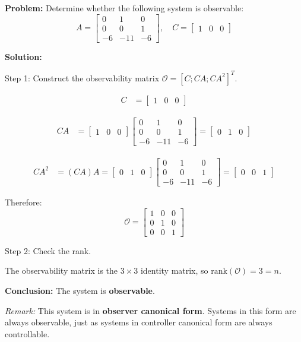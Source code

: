 \begin{examplebox}
\textbf{Problem:} Determine whether the following system is observable:
\begin{equation}
A = \begin{bmatrix} 0 & 1 & 0 \\ 0 & 0 & 1 \\ -6 & -11 & -6 \end{bmatrix}, \quad
C = \begin{bmatrix} 1 & 0 & 0 \end{bmatrix}
\end{equation}

\textbf{Solution:}

Step 1: Construct the observability matrix $\mathcal{O} = [C; CA; CA^2]^T$.

\begin{align}
C &= \begin{bmatrix} 1 & 0 & 0 \end{bmatrix}
\end{align}

\begin{align}
CA &= \begin{bmatrix} 1 & 0 & 0 \end{bmatrix} \begin{bmatrix} 0 & 1 & 0 \\ 0 & 0 & 1 \\ -6 & -11 & -6 \end{bmatrix} = \begin{bmatrix} 0 & 1 & 0 \end{bmatrix}
\end{align}

\begin{align}
CA^2 &= (CA)A = \begin{bmatrix} 0 & 1 & 0 \end{bmatrix} \begin{bmatrix} 0 & 1 & 0 \\ 0 & 0 & 1 \\ -6 & -11 & -6 \end{bmatrix} = \begin{bmatrix} 0 & 0 & 1 \end{bmatrix}
\end{align}

Therefore:
\begin{equation}
\mathcal{O} = \begin{bmatrix} 1 & 0 & 0 \\ 0 & 1 & 0 \\ 0 & 0 & 1 \end{bmatrix}
\end{equation}

Step 2: Check the rank.

The observability matrix is the $3 \times 3$ identity matrix, so $\text{rank}(\mathcal{O}) = 3 = n$.

\textbf{Conclusion:} The system is \textbf{observable}.

\textit{Remark:} This system is in \textbf{observer canonical form}. Systems in this form are always observable, just as systems in controller canonical form are always controllable.
\end{examplebox}

